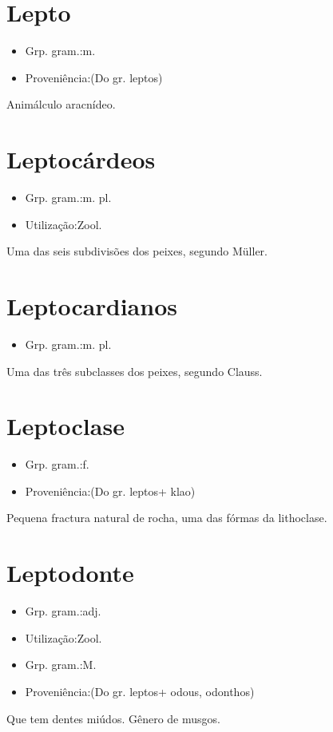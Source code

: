\section{Lepto}
\begin{itemize}
\item {Grp. gram.:m.}
\end{itemize}
\begin{itemize}
\item {Proveniência:(Do gr. \textunderscore leptos\textunderscore )}
\end{itemize}
Animálculo aracnídeo.
\section{Leptocárdeos}
\begin{itemize}
\item {Grp. gram.:m. pl.}
\end{itemize}
\begin{itemize}
\item {Utilização:Zool.}
\end{itemize}
Uma das seis subdivisões dos peixes, segundo Müller.
\section{Leptocardianos}
\begin{itemize}
\item {Grp. gram.:m. pl.}
\end{itemize}
Uma das três subclasses dos peixes, segundo Clauss.
\section{Leptoclase}
\begin{itemize}
\item {Grp. gram.:f.}
\end{itemize}
\begin{itemize}
\item {Proveniência:(Do gr. \textunderscore leptos\textunderscore  + \textunderscore klao\textunderscore )}
\end{itemize}
Pequena fractura natural de rocha, uma das fórmas da lithoclase.
\section{Leptodonte}
\begin{itemize}
\item {Grp. gram.:adj.}
\end{itemize}
\begin{itemize}
\item {Utilização:Zool.}
\end{itemize}
\begin{itemize}
\item {Grp. gram.:M.}
\end{itemize}
\begin{itemize}
\item {Proveniência:(Do gr. \textunderscore leptos\textunderscore  + \textunderscore odous\textunderscore , \textunderscore odonthos\textunderscore )}
\end{itemize}
Que tem dentes miúdos.
Gênero de musgos.
